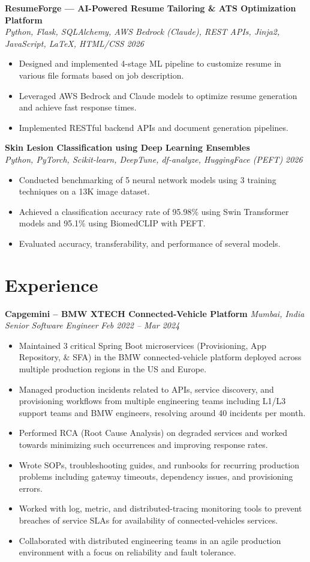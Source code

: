 \documentclass[10pt, letterpaper]{article}
\newcommand{\resumeItem}[1]{\item\small{#1}}
\newcommand{\resumeSubheading}[4]{
  \textbf{#3} \hfill \textit{\small #4} \\
  \textit{\small #1} \hfill \textit{\small #2}
}
\begin{document}
\resumeSubheading{Python, Flask, SQLAlchemy, AWS Bedrock (Claude), REST APIs, Jinja2, JavaScript, LaTeX, HTML/CSS}{2026}{ResumeForge — AI-Powered Resume Tailoring \& ATS Optimization Platform}{}
\begin{itemize}[leftmargin=1.5em, itemsep=0pt, topsep=2pt]
  \resumeItem{Designed and implemented 4-stage ML pipeline to customize resume in various file formats based on job description.}
  \resumeItem{Leveraged AWS Bedrock and Claude models to optimize resume generation and achieve fast response times.}
  \resumeItem{Implemented RESTful backend APIs and document generation pipelines.}
\end{itemize}

\vspace{-1pt}

\resumeSubheading{Python, PyTorch, Scikit-learn, DeepTune, df-analyze, HuggingFace (PEFT)}{2026}{Skin Lesion Classification using Deep Learning Ensembles}{}
\begin{itemize}[leftmargin=1.5em, itemsep=0pt, topsep=2pt]
  \resumeItem{Conducted benchmarking of 5 neural network models using 3 training techniques on a 13K image dataset.}
  \resumeItem{Achieved a classification accuracy rate of 95.98\% using Swin Transformer models and 95.1\% using BiomedCLIP with PEFT.}
  \resumeItem{Evaluated accuracy, transferability, and performance of several models.}
\end{itemize}

\vspace{-1pt}

\vspace{1pt}

\section{Experience}

\resumeSubheading{Senior Software Engineer}{Feb 2022 -- Mar 2024}{Capgemini -- BMW XTECH Connected-Vehicle Platform}{Mumbai, India}
\begin{itemize}[leftmargin=1.5em, itemsep=0pt, topsep=2pt]
  \resumeItem{Maintained 3 critical Spring Boot microservices (Provisioning, App Repository, \& SFA) in the BMW connected-vehicle platform deployed across multiple production regions in the US and Europe.}
  \resumeItem{Managed production incidents related to APIs, service discovery, and provisioning workflows from multiple engineering teams including L1/L3 support teams and BMW engineers, resolving around 40 incidents per month.}
  \resumeItem{Performed RCA (Root Cause Analysis) on degraded services and worked towards minimizing such occurrences and improving response rates.}
  \resumeItem{Wrote SOPs, troubleshooting guides, and runbooks for recurring production problems including gateway timeouts, dependency issues, and provisioning errors.}
  \resumeItem{Worked with log, metric, and distributed-tracing monitoring tools to prevent breaches of service SLAs for availability of connected-vehicles services.}
  \resumeItem{Collaborated with distributed engineering teams in an agile production environment with a focus on reliability and fault tolerance.}
\end{itemize}
\end{document}
